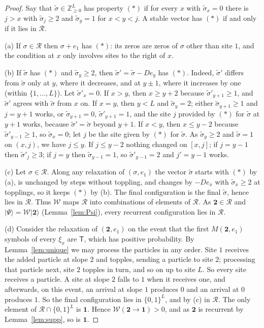 \documentclass[11pt]{amsart}
\theoremstyle{definition}
\theoremstyle{remark}
\newcommand{\Z}{\mathbb{Z}}
\newcommand{\cR}{\mathcal{R}}
\newcommand{\cW}{\mathcal{W}}
\newcommand{\ket}[1]{|#1\rangle}
\newcommand{\two}{\mathbf{2}}
\newcommand{\one}{\mathbf{1}}
\begin{document}
\begin{proof}
Say that $\tilde\sigma\in\Z_{\ge0}^L$ has property $(\ast)$ if for every $x$ with $\tilde\sigma_x=0$ there is $j>x$ with $\tilde\sigma_j\ge2$ and $\tilde\sigma_y=1$ for $x<y<j$. A stable vector has $(\ast)$ if and only if it lies in $\cR$.

(a) If $\sigma\in\cR$ then $\sigma+e_1$ has $(\ast)$: its zeros are zeros of $\sigma$ other than site $1$, and the condition at $x$ only involves sites to the right of $x$.

(b) If $\tilde\sigma$ has $(\ast)$ and $\tilde\sigma_y\ge2$, then $\tilde\sigma'=\tilde\sigma-De_y$ has $(\ast)$. Indeed, $\tilde\sigma'$ differs from $\tilde\sigma$ only at $y$, where it decreases, and at $y\pm1$, where it increases by one (within $\{1,\dots,L\}$). Let $\tilde\sigma'_x=0$. If $x>y$, then $x\ge y+2$ because $\tilde\sigma'_{y+1}\ge1$, and $\tilde\sigma'$ agrees with $\tilde\sigma$ from $x$ on. If $x=y$, then $y<L$ and $\tilde\sigma_y=2$; either $\tilde\sigma_{y+1}\ge1$ and $j=y+1$ works, or $\tilde\sigma_{y+1}=0$, $\tilde\sigma'_{y+1}=1$, and the site $j$ provided by $(\ast)$ for $\tilde\sigma$ at $y+1$ works, because $\tilde\sigma'=\tilde\sigma$ beyond $y+1$. If $x<y$, then $x\le y-2$ because $\tilde\sigma'_{y-1}\ge1$, so $\tilde\sigma_x=0$; let $j$ be the site given by $(\ast)$ for $\tilde\sigma$. As $\tilde\sigma_y\ge2$ and $\tilde\sigma=1$ on $(x,j)$, we have $j\le y$. If $j\le y-2$ nothing changed on $[x,j]$; if $j=y-1$ then $\tilde\sigma'_j\ge3$; if $j=y$ then $\tilde\sigma_{y-1}=1$, so $\tilde\sigma'_{y-1}=2$ and $j'=y-1$ works.

(c) Let $\sigma\in\cR$. Along any relaxation of $(\sigma,e_1)$ the vector $\tilde\sigma$ starts with $(\ast)$ by (a), is unchanged by steps without toppling, and changes by $-De_x$ with $\tilde\sigma_x\ge2$ at topplings, so it keeps $(\ast)$ by (b). The final configuration is the final $\tilde\sigma$, hence lies in $\cR$. Thus $\cW$ maps $\cR$ into combinations of elements of $\cR$. As $\two\in\cR$ and $\ket\Psi=\cW\ket\two$ (Lemma~\ref{lem:Psi}), every recurrent configuration lies in $\cR$.

(d) Consider the relaxation of $(\two,e_1)$ on the event that the first $M(\two,e_1)$ symbols of every $\xi_x$ are $\mathsf T$, which has positive probability. By Lemma~\ref{lem:unique} we may process the particles in any order. Site $1$ receives the added particle at slope $2$ and topples, sending a particle to site $2$; processing that particle next, site $2$ topples in turn, and so on up to site $L$. So every site receives a particle. A site at slope $2$ falls to $1$ when it receives one, and afterwards, on this event, an arrival at slope $1$ produces $0$ and an arrival at $0$ produces $1$. So the final configuration lies in $\{0,1\}^L$, and by (c) in $\cR$. The only element of $\cR\cap\{0,1\}^L$ is $\one$. Hence $\cW(\two\to\one)>0$, and as $\two$ is recurrent by Lemma~\ref{lem:supp}, so is $\one$.
\end{proof}
\end{document}
